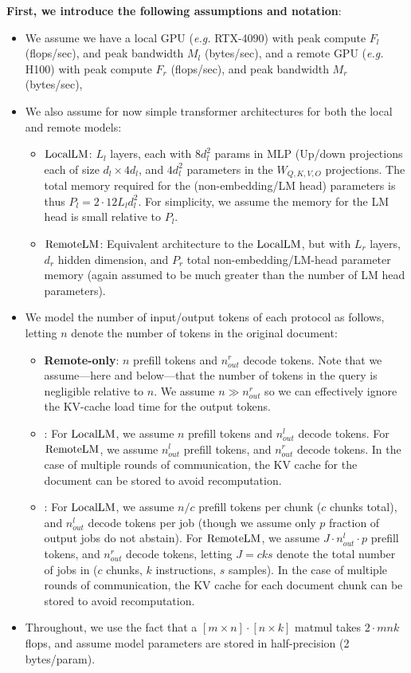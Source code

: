 \textbf{First, we introduce the following assumptions and notation}:
\begin{itemize}
\item We assume we have a local GPU (\textit{e.g.} RTX-4090) with peak compute $F_l$ (flops/sec), and peak bandwidth $M_l$ (bytes/sec), and a remote GPU (\textit{e.g.} H100) with peak compute $F_r$ (flops/sec), and peak bandwidth $M_r$ (bytes/sec), 
\item We also assume for now simple transformer architectures for both the local and remote models:
\begin{itemize}
\item $\mathrm{LocalLM}$: $L_l$ layers, each with $8d_l^2$ params in MLP (Up/down projections each of size $d_l\times 4d_l$, and $4d_l^2$ parameters in the $W_{Q,K,V,O}$ projections.
The total memory required for the (non-embedding/LM head) parameters is thus $P_l = 2 \cdot 12 L_l d_l^2$.
For simplicity, we assume the memory for the LM head is small relative to $P_l$.
\item $\mathrm{RemoteLM}$: Equivalent architecture to the $\mathrm{LocalLM}$, but with $L_r$ layers, $d_r$ hidden dimension, and $P_r$ total non-embedding/LM-head parameter memory (again assumed to be much greater than the number of LM head parameters).
\end{itemize}
\item We model the number of input/output tokens of each protocol as follows, letting $n$ denote the number of tokens in the original document:
\begin{itemize}
    \item \textbf{Remote-only}: $n$ prefill tokens and $n_{out}^r$ decode tokens.
    Note that we assume---here and below---that the number of tokens in the query is negligible relative to $n$.
    We assume $n \gg n_{out}^r$ so we can effectively ignore the KV-cache load time for the output tokens.
    \item \textbf{\naive}: For $\mathrm{LocalLM}$, we assume $n$ prefill tokens and $n_{out}^l$ decode tokens.
    For $\mathrm{RemoteLM}$, we assume $n_{out}^l$ prefill tokens, and $n_{out}^r$ decode tokens.
    In the case of multiple rounds of communication, the KV cache for the document can be stored to avoid recomputation.
    \item \textbf{\system}: For $\mathrm{LocalLM}$, we assume $n/c$ prefill tokens per chunk ($c$ chunks total), and $n_{out}^l$ decode tokens per job (though we assume only $p$ fraction of output jobs do not abstain).
    For $\mathrm{RemoteLM}$, we assume $J \cdot n_{out}^l \cdot p$ prefill tokens, and $n_{out}^r$ decode tokens, letting $J=cks$ denote the total number of jobs in \system ($c$ chunks, $k$ instructions, $s$ samples).
    In the case of multiple rounds of communication, the KV cache for each document chunk can be stored to avoid recomputation.
\end{itemize}
\item Throughout, we use the fact that a $[m \times n] \cdot [n \times k]$ matmul takes $2\cdot mnk$ flops, and assume model parameters are stored in half-precision (2 bytes/param).
\end{itemize}



